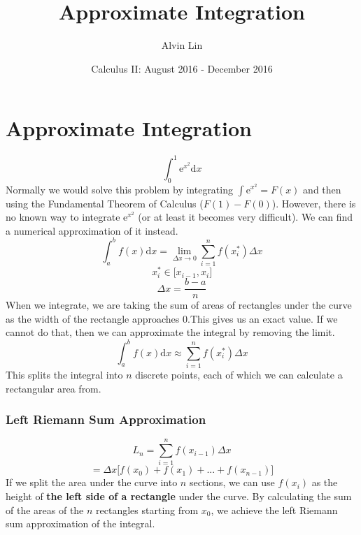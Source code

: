 \documentclass[letterpaper, 12pt]{article}
\title{Approximate Integration}
\author{Alvin Lin}
\date{Calculus II: August 2016 - December 2016}
\newcommand*{\diff}{\mathrm{d}}
\newcommand*{\e}{\mathrm{e}}
\begin{document}
\maketitle

\section*{Approximate Integration}
\[ \int_{0}^{1}{\e^{x^{2}}\diff{x}} \]
Normally we would solve this problem by integrating
\( \int{\e^{x^{2}}} = F(x) \) and
then using the Fundamental Theorem of Calculus (\( F(1)-F(0) \)). However, there
is no known way to integrate \( \e^{x^{2}} \) (or at least it becomes very
difficult). We can find a numerical approximation of it instead.
\[ \int_{a}^{b}{f(x)\diff{x}} = \lim_{\Delta x \to 0}
   \sum_{i=1}^{n}{f(x_{i}^{*})\Delta x} \]
\[ x_{i}^{*}\in\bigg[x_{i-1},x_{i}\bigg] \]
\[ \Delta x = \frac{b-a}{n} \]
When we integrate, we are taking the sum of areas of rectangles under the curve
as the width of the rectangle approaches 0.This gives us an exact value. If we
cannot do that, then we can approximate the integral by removing the limit.
\[ \int_{a}^{b}{f(x)\diff{x}} \approx \sum_{i=1}^{n}{f(x_{i}^{*})\Delta x} \]
This splits the integral into \( n \) discrete points, each of which we can
calculate a rectangular area from.

\subsubsection*{Left Riemann Sum Approximation}
\[ L_{n} = \sum_{i=1}^{n}{f(x_{i-1})\Delta x} \]
\[ = \Delta x\bigg[f(x_{0})+f(x_{1})+...+f(x_{n-1})\bigg] \]
If we split the area under the curve into \(n\) sections, we can use
\( f(x_{i}) \) as the height of \textbf{the left side of a rectangle} under the
curve. By calculating the sum of the areas of the \(n\) rectangles starting from
\( x_{0} \), we achieve the left Riemann sum approximation of the integral.
\begin{center}
\end{center}
\end{document}
